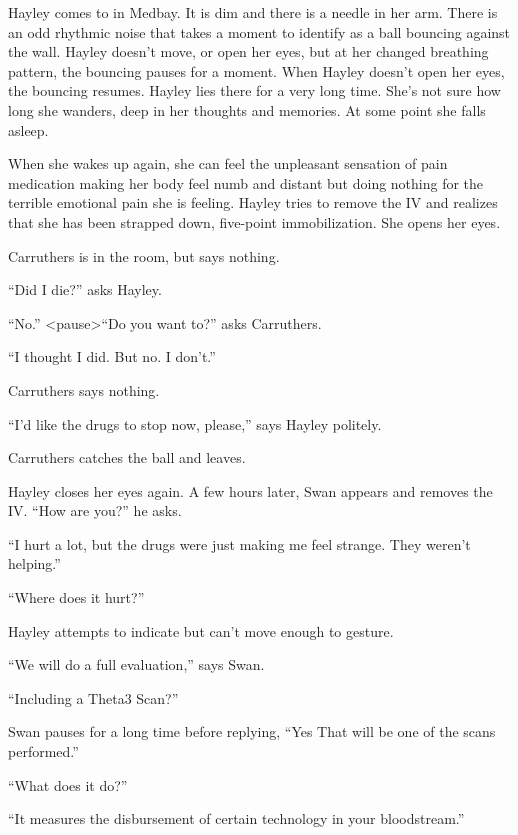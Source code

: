 
Hayley comes to in Medbay.  It is dim and there is a needle in her arm.  There is an odd rhythmic noise that takes a moment to identify as a ball bouncing against the wall.  Hayley doesn't move, or open her eyes, but at her changed breathing pattern, the bouncing pauses for a moment.  When Hayley doesn't open her eyes, the bouncing resumes.  Hayley lies there for a very long time.  She's not sure how long she wanders, deep in her thoughts and memories.  At some point she falls asleep.



When she wakes up again, she can feel the unpleasant sensation of pain medication making her body feel numb and distant but doing nothing for the terrible emotional pain she is feeling.  Hayley tries to remove the IV and realizes that she has been strapped down, five-point immobilization.  She opens her eyes.



Carruthers is in the room, but says nothing.

``Did I die?'' asks Hayley.

``No.''  \textless pause\textgreater   ``Do you want to?'' asks Carruthers.

``I thought I did.  But no.  I don't.''  

Carruthers says nothing.

``I'd like the drugs to stop now, please,'' says Hayley politely.

Carruthers catches the ball and leaves.



Hayley closes her eyes again.  A few hours later, Swan appears and removes the IV.  ``How are you?'' he asks.

``I hurt a lot, but the drugs were just making me feel strange.  They weren't helping.''

``Where does it hurt?''

Hayley attempts to indicate but can't move enough to gesture.

``We will do a full evaluation,'' says Swan.

``Including a Theta3 Scan?''

Swan pauses for a long time before replying, ``Yes  That will be one of the scans performed.''

``What does it do?''

``It measures the disbursement of certain technology in your bloodstream.''


